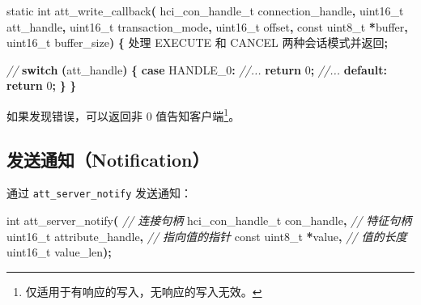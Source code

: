 \documentclass[
  12pt,
]{book}
\newenvironment{Shaded}{\begin{snugshade}}{\end{snugshade}}
\newcommand{\CommentTok}[1]{\textcolor[rgb]{0.56,0.35,0.01}{\textit{#1}}}
\newcommand{\ControlFlowTok}[1]{\textcolor[rgb]{0.13,0.29,0.53}{\textbf{#1}}}
\newcommand{\DataTypeTok}[1]{\textcolor[rgb]{0.13,0.29,0.53}{#1}}
\newcommand{\DecValTok}[1]{\textcolor[rgb]{0.00,0.00,0.81}{#1}}
\newcommand{\NormalTok}[1]{#1}
\newcommand{\OperatorTok}[1]{\textcolor[rgb]{0.81,0.36,0.00}{\textbf{#1}}}
\begin{document}
\begin{Shaded}
\begin{Highlighting}[]
\DataTypeTok{static} \DataTypeTok{int}\NormalTok{ att\_write\_callback}\OperatorTok{(}
\NormalTok{  hci\_con\_handle\_t connection\_handle}\OperatorTok{,} \DataTypeTok{uint16\_t}\NormalTok{ att\_handle}\OperatorTok{,}
  \DataTypeTok{uint16\_t}\NormalTok{ transaction\_mode}\OperatorTok{,}
  \DataTypeTok{uint16\_t}\NormalTok{ offset}\OperatorTok{,} \DataTypeTok{const} \DataTypeTok{uint8\_t} \OperatorTok{*}\NormalTok{buffer}\OperatorTok{,} \DataTypeTok{uint16\_t}\NormalTok{ buffer\_size}\OperatorTok{)}
\OperatorTok{\{}
\NormalTok{    处理 EXECUTE 和 CANCEL 两种会话模式并返回}\OperatorTok{;}

    \CommentTok{//}
    \ControlFlowTok{switch} \OperatorTok{(}\NormalTok{att\_handle}\OperatorTok{)}
    \OperatorTok{\{}
    \ControlFlowTok{case}\NormalTok{ HANDLE\_0}\OperatorTok{:}
        \CommentTok{//...}
        \ControlFlowTok{return} \DecValTok{0}\OperatorTok{;}
    \CommentTok{//...}
    \ControlFlowTok{default}\OperatorTok{:}
        \ControlFlowTok{return} \DecValTok{0}\OperatorTok{;}
    \OperatorTok{\}}
\OperatorTok{\}}
\end{Highlighting}
\end{Shaded}

如果发现错误，可以返回非 0 值告知客户端\footnote{仅适用于有响应的写入，无响应的写入无效。}。

\hypertarget{ux53d1ux9001ux901aux77e5notification}{%
\subsection{发送通知（Notification）}\label{ux53d1ux9001ux901aux77e5notification}}

通过 \texttt{att\_server\_notify} 发送通知：

\begin{Shaded}
\begin{Highlighting}[]
\DataTypeTok{int}\NormalTok{ att\_server\_notify}\OperatorTok{(}
  \CommentTok{// 连接句柄}
\NormalTok{  hci\_con\_handle\_t con\_handle}\OperatorTok{,}
  \CommentTok{// 特征句柄}
  \DataTypeTok{uint16\_t}\NormalTok{ attribute\_handle}\OperatorTok{,}
  \CommentTok{// 指向值的指针}
  \DataTypeTok{const} \DataTypeTok{uint8\_t} \OperatorTok{*}\NormalTok{value}\OperatorTok{,}
  \CommentTok{// 值的长度}
  \DataTypeTok{uint16\_t}\NormalTok{ value\_len}\OperatorTok{);}
\end{Highlighting}
\end{Shaded}
\end{document}
